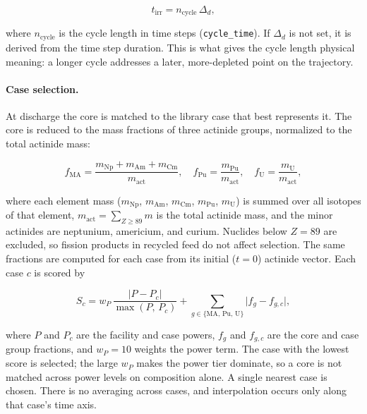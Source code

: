 \begin{equation}
    t_{\mathrm{irr}} = n_{\mathrm{cycle}}\,\Delta_d,
    \label{eq:ads-tirr}
\end{equation}

where $n_{\mathrm{cycle}}$ is the cycle length in time steps
(\texttt{cycle\_time}). If $\Delta_d$ is not set, it is derived from the time step
duration. This is what gives the cycle length physical meaning: a longer cycle
addresses a later, more-depleted point on the trajectory.

\paragraph{Case selection.}
At discharge the core is matched to the library case that best represents it. The
core is reduced to the mass fractions of three actinide groups, normalized to the
total actinide mass:

\begin{equation}
    f_{\mathrm{MA}} = \frac{m_{\mathrm{Np}}+m_{\mathrm{Am}}+m_{\mathrm{Cm}}}
                           {m_{\mathrm{act}}},
    \quad
    f_{\mathrm{Pu}} = \frac{m_{\mathrm{Pu}}}{m_{\mathrm{act}}},
    \quad
    f_{\mathrm{U}}  = \frac{m_{\mathrm{U}}}{m_{\mathrm{act}}},
    \label{eq:ads-fractions}
\end{equation}

where each element mass ($m_{\mathrm{Np}}$, $m_{\mathrm{Am}}$, $m_{\mathrm{Cm}}$,
$m_{\mathrm{Pu}}$, $m_{\mathrm{U}}$) is summed over all isotopes of that element,
$m_{\mathrm{act}} = \sum_{Z\geq 89} m$ is the total actinide mass, and the minor
actinides are neptunium, americium, and curium. Nuclides below $Z = 89$ are
excluded, so fission products in recycled feed do not affect selection. The same
fractions are computed for each case from its initial ($t=0$) actinide vector.
Each case $c$ is scored by

\begin{equation}
    S_c = w_P\,\frac{\lvert P - P_c\rvert}{\max(P,\,P_c)}
          + \sum_{g \in \{\mathrm{MA},\,\mathrm{Pu},\,\mathrm{U}\}}
            \lvert f_g - f_{g,c}\rvert,
    \label{eq:ads-score}
\end{equation}

where $P$ and $P_c$ are the facility and case powers, $f_g$ and $f_{g,c}$ are the
core and case group fractions, and $w_P = 10$ weights the power term. The
case with the lowest score is selected; the large $w_P$ makes the power tier
dominate, so a core is not matched across power levels on composition alone. A
single nearest case is chosen. There is no averaging across cases, and
interpolation occurs only along that case's time axis.

